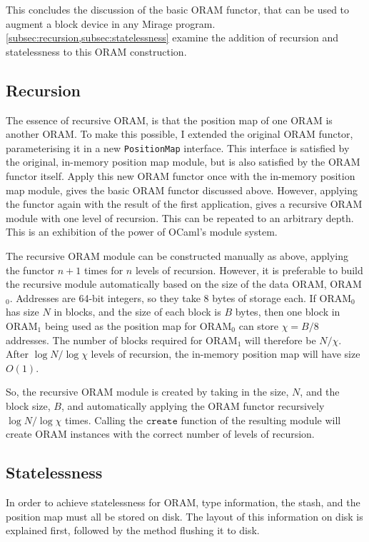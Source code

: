 \documentclass[12pt,a4paper,twoside,openright]{report}
\begin{document}
This concludes the discussion of the basic ORAM functor, that can be used to augment a block device in any Mirage program. \cref{subsec:recursion,subsec:statelessness} examine the addition of recursion and statelessness to this ORAM construction.

\subsection{Recursion}
\label{subsec:recursion}

The essence of recursive ORAM, is that the position map of one ORAM is another ORAM. To make this possible, I extended the original ORAM functor, parameterising it in a new \texttt{PositionMap} interface. This interface is satisfied by the original, in-memory position map module, but is also satisfied by the ORAM functor itself. Apply this new ORAM functor once with the in-memory position map module, gives the basic ORAM functor discussed above. However, applying the functor again with the result of the first application, gives a recursive ORAM module with one level of recursion. This can be repeated to an arbitrary depth. This is an exhibition of the power of OCaml's module system.

The recursive ORAM module can be constructed manually as above, applying the functor $n + 1$ times for $n$ levels of recursion. However, it is preferable to build the recursive module automatically based on the size of the data ORAM, ORAM$_0$. Addresses are 64-bit integers, so they take 8 bytes of storage each. If ORAM$_0$ has size $N$ in blocks, and the size of each block is $B$ bytes, then one block in ORAM$_1$ being used as the position map for ORAM$_0$ can store $\chi = B / 8$ addresses. The number of blocks required for ORAM$_1$ will therefore be $N / \chi$. After $\log N / \log \chi$ levels of recursion, the in-memory position map will have size $O(1)$.

So, the recursive ORAM module is created by taking in the size, $N$, and the block size, $B$, and automatically applying the ORAM functor recursively $\log N / \log \chi$ times. Calling the $\mathtt{create}$ function of the resulting module will create ORAM instances with the correct number of levels of recursion.

\subsection{Statelessness}
\label{subsec:statelessness}

In order to achieve statelessness for ORAM, type information, the stash, and the position map must all be stored on disk. The layout of this information on disk is explained first, followed by the method flushing it to disk.
\end{document}

